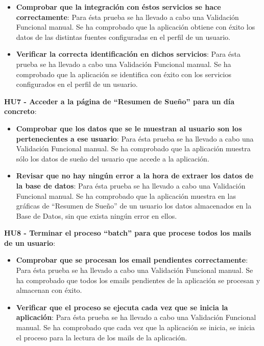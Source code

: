 \documentclass[11pt,openany]{book}
\begin{document}
\begin{itemize}
\item\textbf{Comprobar que la integración con éstos servicios se hace correctamente}: Para ésta prueba se ha llevado a cabo una Validación Funcional manual. Se ha comprobado que la aplicación obtiene con éxito los datos de las distintas fuentes configuradas en el perfil de un usuario.
\item\textbf{Verificar la correcta identificación en dichos servicios}: Para ésta prueba se ha llevado a cabo una Validación Funcional manual. Se ha comprobado que la aplicación se identifica con éxito con los servicios configurados en el perfil de un usuario.
\end{itemize}
 
\textbf{HU7 -  Acceder a la página de ``Resumen de Sueño'' para un día concreto}:

\begin{itemize}
\item\textbf{Comprobar que los datos que se le muestran al usuario son los pertenecientes a ese usuario}: Para ésta prueba se ha llevado a cabo una Validación Funcional manual. Se ha comprobado que la aplicación muestra sólo los datos de sueño del usuario que accede a la aplicación.
\item\textbf{Revisar que no hay ningún error a la hora de extraer los datos de la base de datos}: Para ésta prueba se ha llevado a cabo una Validación Funcional manual. Se ha comprobado que la aplicación muestra en las gráficas de ``Resumen de Sueño'' de un usuario los datos almacenados en la Base de Datos, sin que exista ningún error en ellos.
\end{itemize}
 
\textbf{HU8 - Terminar el proceso ``batch'' para que procese todos los mails de un usuario}:

\begin{itemize}
\item\textbf{Comprobar que se procesan los email pendientes correctamente}: Para ésta prueba se ha llevado a cabo una Validación Funcional manual. Se ha comprobado que todos los emails pendientes de la aplicación se procesan y almacenan con éxito.
\item\textbf{Verificar que el proceso se ejecuta cada vez que se inicia la aplicación}: Para ésta prueba se ha llevado a cabo una Validación Funcional manual. Se ha comprobado que cada vez que la aplicación se inicia, se inicia el proceso para la lectura de los mails de la aplicación.
\end{itemize}
\end{document}
